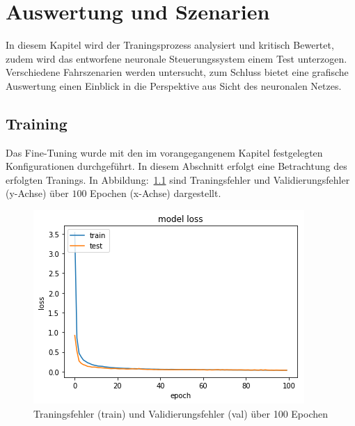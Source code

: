 %
\chapter{Auswertung und Szenarien}
In diesem Kapitel wird der Traningsprozess analysiert und kritisch Bewertet, zudem wird das entworfene neuronale Steuerungssystem einem Test unterzogen. Verschiedene Fahrszenarien werden untersucht, zum Schluss bietet eine grafische Auswertung einen Einblick in die Perspektive aus Sicht des neuronalen Netzes.

\section{Training}
Das Fine-Tuning wurde mit den im vorangegangenem Kapitel festgelegten Konfigurationen durchgeführt. In diesem Abschnitt erfolgt eine Betrachtung des erfolgten Tranings. In Abbildung:~\ref{img:loss} sind Traningsfehler und Validierungsfehler (y-Achse) über $100$ Epochen (x-Achse) dargestellt. 

\begin{figure}[h]
	\centering
	\includegraphics[scale=0.7]{figures/loss.png}
	\caption{Traningsfehler (train) und Validierungsfehler (val) über 100 Epochen}
	\label{img:loss}
\end{figure}

